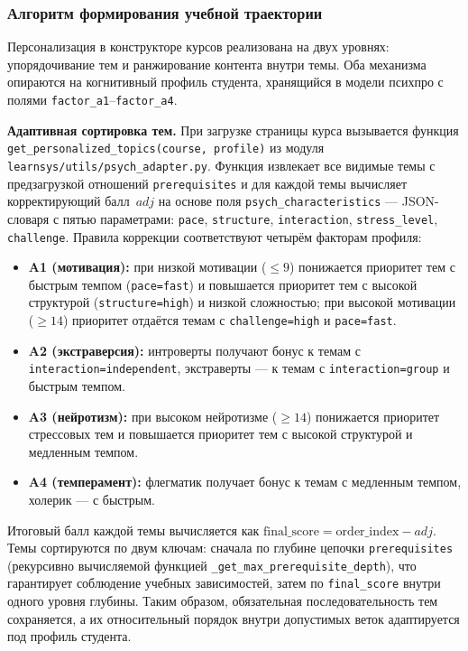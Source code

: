 \subsubsection{Алгоритм формирования учебной траектории}

Персонализация в конструкторе курсов реализована на двух уровнях:
упорядочивание тем и ранжирование контента внутри темы. Оба механизма
опираются на когнитивный профиль студента, хранящийся в модели
психпро с полями \texttt{factor\_a1}--\texttt{factor\_a4}.

\textbf{Адаптивная сортировка тем.}
При загрузке страницы курса вызывается функция
\texttt{get\_personalized\_topics(course, profile)} из модуля
\texttt{learnsys/utils/psych\_adapter.py}. Функция извлекает все видимые
темы с предзагрузкой отношений \texttt{prerequisites} и для каждой темы
вычисляет корректирующий балл~$adj$ на основе поля
\texttt{psych\_characteristics} — JSON-словаря с пятью параметрами:
\texttt{pace}, \texttt{structure}, \texttt{interaction},
\texttt{stress\_level}, \texttt{challenge}. Правила коррекции
соответствуют четырём факторам профиля:

\begin{itemize}
  \item \textbf{A1 (мотивация):} при низкой мотивации ($\leq 9$) понижается
  приоритет тем с быстрым темпом (\texttt{pace=fast}) и повышается приоритет
  тем с высокой структурой (\texttt{structure=high}) и низкой сложностью;
  при высокой мотивации ($\geq 14$) приоритет отдаётся темам с
  \texttt{challenge=high} и \texttt{pace=fast}.
  \item \textbf{A2 (экстраверсия):} интроверты получают бонус к темам с
  \texttt{interaction=independent}, экстраверты — к темам с
  \texttt{interaction=group} и быстрым темпом.
  \item \textbf{A3 (нейротизм):} при высоком нейротизме ($\geq 14$)
  понижается приоритет стрессовых тем и повышается приоритет тем с
  высокой структурой и медленным темпом.
  \item \textbf{A4 (темперамент):} флегматик получает бонус к темам с
  медленным темпом, холерик — с быстрым.
\end{itemize}

Итоговый балл каждой темы вычисляется как
$\text{final\_score} = \text{order\_index} - adj$. Темы сортируются
по двум ключам: сначала по глубине цепочки \texttt{prerequisites}
(рекурсивно вычисляемой функцией \texttt{\_get\_max\_prerequisite\_depth}),
что гарантирует соблюдение учебных зависимостей, затем по
\texttt{final\_score} внутри одного уровня глубины. Таким образом,
обязательная последовательность тем сохраняется, а их относительный
порядок внутри допустимых веток адаптируется под профиль студента.

